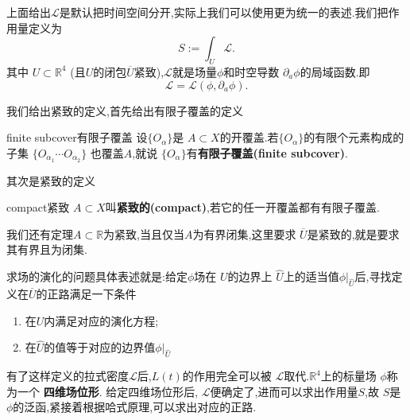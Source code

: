 \documentclass[../main.tex]{subfiles}
\begin{document}
 上面给出$\mathscr{L}$是默认把时间空间分开,实际上我们可以使用更为统一的表述.我们把作用量定义为 \[
 S:= \int_U \mathscr{L}
 .\] 
 其中 $U \subset  \mathbb{R}^4$ (且$U$的闭包$\overline{U}$紧致),$\mathscr{L}$就是场量$\phi$和时空导数 $\partial_a \phi$的局域函数.即 \[
 \mathscr{L} = \mathscr{L}(\phi,\partial_a\phi)
 .\] 
 \begin{note}
 我们给出紧致的定义,首先给出有限子覆盖的定义
 \begin{definition}
   {finite subcover}{有限子覆盖}
   设$\{O_\alpha\}$是 $A \subset X$的开覆盖.若$\{O_\alpha\}$的有限个元素构成的子集 $\{O_{\alpha_1} \cdots O_{\alpha_2}\}$ 也覆盖$A$,就说 $\{O_\alpha\}$有\textbf{有限子覆盖(finite subcover)}.
 \end{definition}
 其次是紧致的定义
 \begin{definition}
   {compact}{紧致}
   $A\subset X$叫\textbf{紧致的(compact)},若它的任一开覆盖都有有限子覆盖.
 \end{definition}
 我们还有定理$A \subset \mathbb{R}$为紧致,当且仅当$A$为有界闭集,这里要求 $\overline{U}$是紧致的,就是要求其有界且为闭集.
 \end{note}
 求场的演化的问题具体表述就是:给定$\phi$场在 $U$的边界上 $\hat{U}$上的适当值$\phi|_{\hat{U}}$后,寻找定义在$\overline{U}$的正路满足一下条件
 \begin{enumerate}
 \item 在$U$内满足对应的演化方程;
 \item 在$\hat{U}$的值等于对应的边界值$\phi|_{\hat{U}}$
 \end{enumerate}
 有了这样定义的拉式密度$\mathscr{L}$后,$L(t)$的作用完全可以被 $\mathscr{L}$取代.$\mathbb{R}^4$上的标量场 $\phi$称为一个 \textbf{四维场位形}.
 给定四维场位形后, $\mathscr{L}$便确定了,进而可以求出作用量$S$,故 $S$是 $\phi$的泛函,紧接着根据哈式原理,可以求出对应的正路.
\end{document}
